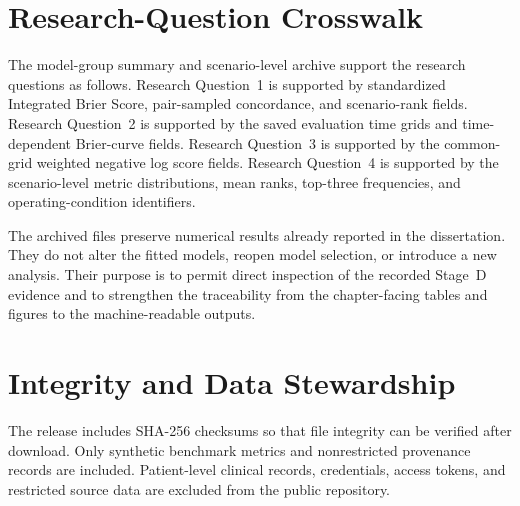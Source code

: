 \FloatBarrier

\section{Research-Question Crosswalk}

The model-group summary and scenario-level archive support the research questions as follows.
Research Question~1 is supported by standardized Integrated Brier Score, pair-sampled
concordance, and scenario-rank fields. Research Question~2 is supported by the saved evaluation
time grids and time-dependent Brier-curve fields. Research Question~3 is supported by the
common-grid weighted negative log score fields. Research Question~4 is supported by the
scenario-level metric distributions, mean ranks, top-three frequencies, and operating-condition
identifiers.

The archived files preserve numerical results already reported in the dissertation. They do not
alter the fitted models, reopen model selection, or introduce a new analysis. Their purpose is to
permit direct inspection of the recorded Stage~D evidence and to strengthen the traceability from
the chapter-facing tables and figures to the machine-readable outputs.

\section{Integrity and Data Stewardship}

The release includes SHA-256 checksums so that file integrity can be verified after download.
Only synthetic benchmark metrics and nonrestricted provenance records are included. Patient-level
clinical records, credentials, access tokens, and restricted source data are excluded from the public
repository.
